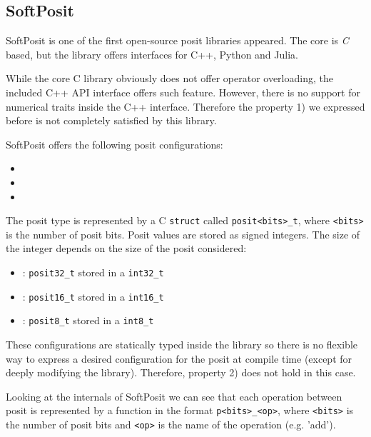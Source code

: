 \subsection{SoftPosit}

SoftPosit \cite{softposit} is one of the first open-source posit libraries appeared. The core is \textit{C} based, but the library offers interfaces for C++, Python and Julia. 

While the core C library obviously does not offer operator overloading, the included C++ API interface offers such feature. However, there is no support for numerical traits inside the C++ interface. Therefore the property 1) we expressed before is not completely satisfied by this library.

SoftPosit offers the following posit configurations:
\begin{itemize}
    \item {}
    \item {}
    \item {}
\end{itemize}



The posit type is represented by a C \texttt{struct} called  \texttt{posit<bits>\_t}, where \texttt{<bits>} is the number of posit bits. Posit values are stored as signed integers. The size of the integer depends on the size of the posit considered:

\begin{itemize}
    \item {}: \texttt{posit32\_t} stored in a \texttt{int32\_t}
    \item {}: \texttt{posit16\_t} stored in a \texttt{int16\_t}
    \item {} : \texttt{posit8\_t}  stored in a \texttt{int8\_t}
\end{itemize}

These configurations are statically typed inside the library so there is no flexible way to express a desired configuration for the posit at compile time (except for deeply modifying the library). Therefore, property 2) does not hold in this case.

Looking at the internals of SoftPosit we can see that each operation between posit is represented by a function in the format \texttt{p<bits>\_<op>}, where \texttt{<bits>} is the number of posit bits and \texttt{<op>} is the name of the operation (e.g. 'add').

